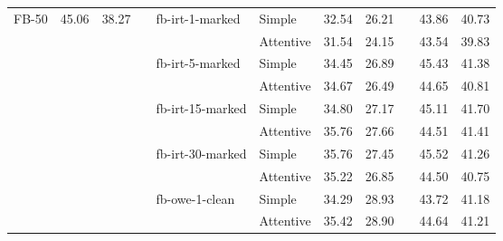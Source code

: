\begin{tabular}{ l r r c l l r r c r r }
    \midrule

    \multirow{10}{*}{FB-50}  & \multirow{10}{*}{45.06} & \multirow{10}{*}{38.27} && \multirow{2}{*}{fb-irt-1-marked}   & Simple    & 32.54 & 26.21 && 43.86 & 40.73 \\
                             &                         &                         &&                                    & Attentive & 31.54 & 24.15 && 43.54 & 39.83 \\ \addlinespace
                             &                         &                         && \multirow{2}{*}{fb-irt-5-marked}   & Simple    & 34.45 & 26.89 && 45.43 & 41.38 \\
                             &                         &                         &&                                    & Attentive & 34.67 & 26.49 && 44.65 & 40.81 \\ \addlinespace
                             &                         &                         && \multirow{2}{*}{fb-irt-15-marked}  & Simple    & 34.80 & 27.17 && 45.11 & 41.70 \\
                             &                         &                         &&                                    & Attentive & 35.76 & 27.66 && 44.51 & 41.41 \\ \addlinespace
                             &                         &                         && \multirow{2}{*}{fb-irt-30-marked}  & Simple    & 35.76 & 27.45 && 45.52 & 41.26 \\
                             &                         &                         &&                                    & Attentive & 35.22 & 26.85 && 44.50 & 40.75 \\ \addlinespace
                             &                         &                         && \multirow{2}{*}{fb-owe-1-clean}    & Simple    & 34.29 & 28.93 && 43.72 & 41.18 \\
                             &                         &                         &&                                    & Attentive & 35.42 & 28.90 && 44.64 & 41.21 \\ \hline

\end{tabular}
